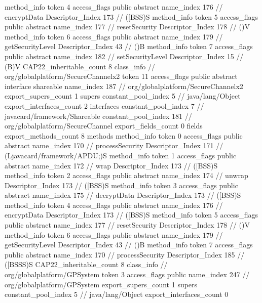 {{{{{				}
				method_info {
					token	4
					access_flags	public abstract
					name_index	176		// encryptData
					Descriptor_Index	173		// ([BSS)S
				}
				method_info {
					token	5
					access_flags	public abstract
					name_index	177		// resetSecurity
					Descriptor_Index	178		// ()V
				}
				method_info {
					token	6
					access_flags	public abstract
					name_index	179		// getSecurityLevel
					Descriptor_Index	43		// ()B
				}
				method_info {
					token	7
					access_flags	public abstract
					name_index	182		// setSecurityLevel
					Descriptor_Index	15		// (B)V
				}
			}
			CAP22_inheritable_count	8
		}
		class_info {		// org/globalplatform/SecureChannelx2
			token	11
			access_flags	public abstract interface shareable
			name_index	187		// org/globalplatform/SecureChannelx2
			export_supers_count	1
			supers {
				constant_pool_index	5		// java/lang/Object
			}
			export_interfaces_count	2
			interfaces {
				constant_pool_index	7		// javacard/framework/Shareable
				constant_pool_index	181		// org/globalplatform/SecureChannel
			}
			export_fields_count	0
			fields {
			}
			export_methods_count	8
			methods {
				method_info {
					token	0
					access_flags	public abstract
					name_index	170		// processSecurity
					Descriptor_Index	171		// (Ljavacard/framework/APDU;)S
				}
				method_info {
					token	1
					access_flags	public abstract
					name_index	172		// wrap
					Descriptor_Index	173		// ([BSS)S
				}
				method_info {
					token	2
					access_flags	public abstract
					name_index	174		// unwrap
					Descriptor_Index	173		// ([BSS)S
				}
				method_info {
					token	3
					access_flags	public abstract
					name_index	175		// decryptData
					Descriptor_Index	173		// ([BSS)S
				}
				method_info {
					token	4
					access_flags	public abstract
					name_index	176		// encryptData
					Descriptor_Index	173		// ([BSS)S
				}
				method_info {
					token	5
					access_flags	public abstract
					name_index	177		// resetSecurity
					Descriptor_Index	178		// ()V
				}
				method_info {
					token	6
					access_flags	public abstract
					name_index	179		// getSecurityLevel
					Descriptor_Index	43		// ()B
				}
				method_info {
					token	7
					access_flags	public abstract
					name_index	170		// processSecurity
					Descriptor_Index	185		// ([BSSS)S
				}
			}
			CAP22_inheritable_count	8
		}
		class_info {		// org/globalplatform/GPSystem
			token	3
			access_flags	public
			name_index	247		// org/globalplatform/GPSystem
			export_supers_count	1
			supers {
				constant_pool_index	5		// java/lang/Object
			}
			export_interfaces_count	0
}}}
